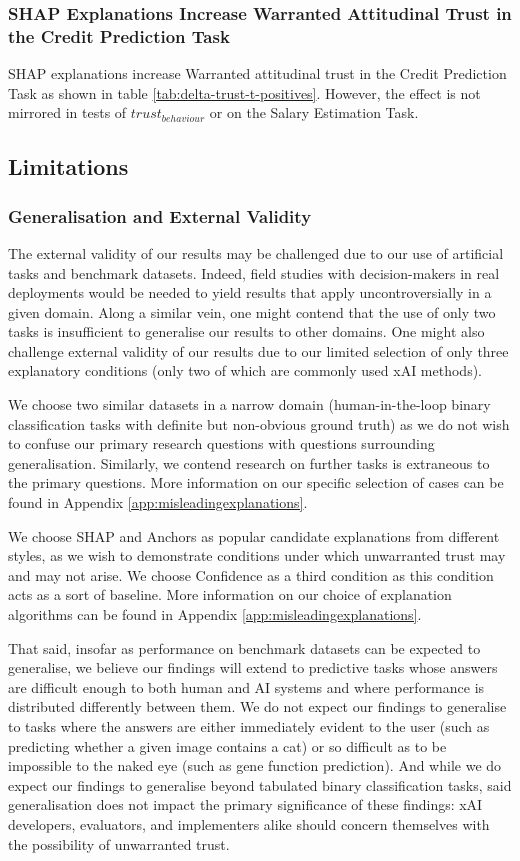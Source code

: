 \subsubsection{SHAP Explanations Increase Warranted Attitudinal Trust in the Credit Prediction Task}
SHAP explanations increase Warranted attitudinal trust in the Credit Prediction Task as shown in table \ref{tab:delta-trust-t-positives}. However, the effect is not mirrored in tests of $trust_{behaviour}$ or on the Salary Estimation Task.

\subsection{Limitations}

\subsubsection{Generalisation and External Validity}
The external validity of our results may be challenged due to our use of artificial tasks and benchmark datasets. Indeed, field studies with decision-makers in real deployments would be needed to yield results that apply uncontroversially in a given domain. Along a similar vein, one might contend that the use of only two tasks is insufficient to generalise our results to other domains. One might also challenge external validity of our results due to our limited selection of only three explanatory conditions (only two of which are commonly used xAI methods).

We choose two similar datasets in a narrow domain (human-in-the-loop binary classification tasks with definite but non-obvious ground truth) as we do not wish to confuse our primary research questions with questions surrounding generalisation. Similarly, we contend research on further tasks is extraneous to the primary questions. More information on our specific selection of cases can be found in Appendix \ref{app:misleadingexplanations}.

We choose SHAP and Anchors as popular candidate explanations from different styles, as we wish to demonstrate conditions under which unwarranted trust may and may not arise. We choose Confidence as a third condition as this condition acts as a sort of baseline. More information on our choice of explanation algorithms can be found in Appendix \ref{app:misleadingexplanations}.

That said, insofar as performance on benchmark datasets can be expected to generalise, we believe our findings will extend to predictive tasks whose answers are difficult enough to both human and AI systems and where performance is distributed differently between them. We do not expect our findings to generalise to tasks where the answers are either immediately evident to the user (such as predicting whether a given image contains a cat) or so difficult as to be impossible to the naked eye (such as gene function prediction). And while we do expect our findings to generalise beyond tabulated binary classification tasks, said generalisation does not impact the primary significance of these findings: xAI developers, evaluators, and implementers alike should concern themselves with the possibility of unwarranted trust.

